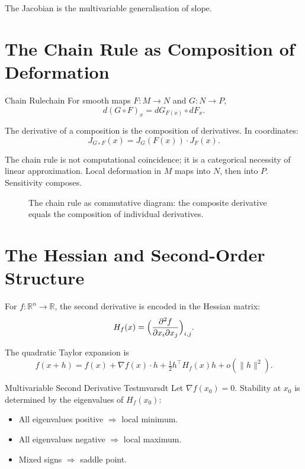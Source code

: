 \documentclass[12pt,openany]{book}
\newcommand{\R}{\mathbb{R}}
\begin{document}
The Jacobian is the multivariable generalisation of slope.

\section{The Chain Rule as Composition of Deformation}

\begin{theorem}{Chain Rule}{chain}
  For smooth maps $F:M\to N$ and $G:N\to P$,
  \[
    d(G\circ F)_x = dG_{F(x)}\circ dF_x.
  \]
\end{theorem}

The derivative of a composition is the composition of derivatives. In
coordinates:
\[
  J_{G\circ F}(x) = J_G(F(x))\cdot J_F(x).
\]

\begin{insight}
  The chain rule is not computational coincidence; it is a categorical necessity
  of linear approximation. Local deformation in $M$ maps into $N$, then into
  $P$. Sensitivity composes.
\end{insight}

\begin{figure}[H]
\centering
{}
\caption{The chain rule as commutative diagram: the composite derivative equals
the composition of individual derivatives.}
\label{fig:chain-cd}
\end{figure}

\section{The Hessian and Second-Order Structure}

For $f:\R^n\to\R$, the second derivative is encoded in the Hessian matrix:
\[
  H_f(x) = \Bigl(\frac{\partial^2 f}{\partial x_i\partial x_j}\Bigr)_{i,j}.
\]

The quadratic Taylor expansion is
\[
  f(x+h) = f(x) + \nabla f(x)\cdot h + \tfrac{1}{2}h^\top H_f(x)h + o(\|h\|^2).
\]

\begin{theorem}{Multivariable Second Derivative Test}{mvarsdt}
  Let $\nabla f(x_0)=0$. Stability at $x_0$ is determined by the eigenvalues of
  $H_f(x_0)$:
  \begin{itemize}[leftmargin=1.5em]
    \item All eigenvalues positive $\Rightarrow$ local minimum.
    \item All eigenvalues negative $\Rightarrow$ local maximum.
    \item Mixed signs $\Rightarrow$ saddle point.
  \end{itemize}
\end{theorem}
\end{document}
